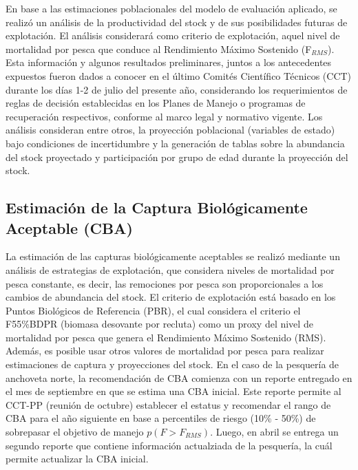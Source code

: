 \documentclass[letter,11pt]{article}
\begin{document}
En base a las estimaciones poblacionales del modelo de evaluaci\'on aplicado,
se realiz\'o un an\'alisis de la productividad del stock y de sus posibilidades
futuras de explotaci\'on. El an\'alisis considerar\'a como criterio de explotaci\'on,
aquel nivel de mortalidad por pesca que conduce al Rendimiento M\'aximo Sostenido
(F$_{RMS}$). Esta informaci\'on y algunos resultados preliminares, juntos a los
antecedentes expuestos fueron dados a conocer en el \'ultimo Comit\'es Cient\'ifico
T\'ecnicos (CCT) durante los d\'ias 1-2 de julio del presente a\~{n}o, considerando
los requerimientos de reglas de decisi\'on establecidas en los Planes de Manejo o
programas de recuperaci\'on respectivos, conforme al marco legal y normativo vigente.
Los an\'alisis consideran entre otros, la proyecci\'on poblacional (variables de estado)
bajo condiciones de incertidumbre y la generaci\'on de tablas sobre la abundancia del
stock proyectado y participaci\'on por grupo de edad durante la proyecci\'on del stock.\\ 


\subsection{Estimaci\'on de la Captura Biol\'ogicamente Aceptable (CBA)}


La estimaci\'on de las capturas biol\'ogicamente aceptables se realiz\'o
mediante un an\'alisis de estrategias de explotaci\'on, que considera
niveles de mortalidad por pesca constante, es decir, las remociones por
pesca son proporcionales a los cambios de abundancia del stock. El
criterio de explotaci\'on est\'a basado en los Puntos Biol\'ogicos de
Referencia (PBR), el cual considera el criterio el F55\%BDPR (biomasa
desovante por recluta) como un proxy del nivel de mortalidad por pesca
que genera el Rendimiento M\'aximo Sostenido (RMS). Adem\'as, es posible
usar otros valores de mortalidad por pesca para realizar estimaciones de
captura y proyecciones del stock. En el caso de la pesquer\'ia de anchoveta
norte, la recomendaci\'on de CBA comienza con un reporte entregado en el mes
de septiembre en que se estima una CBA inicial. Este reporte permite al CCT-PP
(reuni\'on de octubre) establecer el estatus y recomendar el rango de CBA para
el a\~{n}o siguiente en base a percentiles de riesgo (10\% - 50\%) de sobrepasar el
objetivo de manejo $p(F>F_{RMS})$. Luego, en abril se entrega un segundo reporte
que contiene informaci\'on actualziada de la pesquer\'ia, la cu\'al permite
actualizar la CBA inicial. \\
\end{document}
